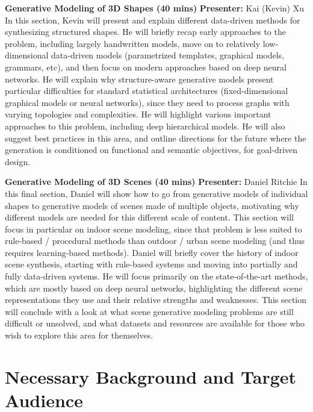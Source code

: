 \documentclass{egpubl}
\begin{document}
\noindent
\textbf{Generative Modeling of 3D Shapes (40 mins)}
\newline
\textbf{Presenter:} Kai (Kevin) Xu
\newline
In this section, Kevin will present and explain different data-driven methods for synthesizing structured shapes. He will briefly recap early approaches to the problem, including largely handwritten models, move on to relatively low-dimensional data-driven models (parametrized templates, graphical models, grammars, etc), and then focus on modern approaches based on deep neural networks. He will explain why structure-aware generative models present particular difficulties for standard statistical architectures (fixed-dimensional graphical models or neural networks), since they need to process graphs with varying topologies and complexities. He will highlight various important approaches to this problem, including deep hierarchical models. He will also suggest best practices in this area, and outline directions for the future where the generation is conditioned on functional and semantic objectives, for goal-driven design.

\noindent
\textbf{Generative Modeling of 3D Scenes (40 mins)}
\newline
\textbf{Presenter:} Daniel Ritchie
\newline
In this final section, Daniel will show how to go from generative models of individual shapes to generative models of scenes made of multiple objects, motivating why different models are needed for this different scale of content.
This section will focus in particular on indoor scene modeling, since that problem is less suited to rule-based / procedural methods than outdoor / urban scene modeling (and thus requires learning-based methods).
Daniel will briefly cover the history of indoor scene synthesis, starting with rule-based systems and moving into partially and fully data-driven systems.
He will focus primarily on the state-of-the-art methods, which are mostly based on deep neural networks, highlighting the different scene representations they use and their relative strengths and weaknesses.
This section will conclude with a look at what scene generative modeling problems are still difficult or unsolved, and what datasets and resources are available for those who wish to explore this area for themselves.

\section{Necessary Background and Target Audience}
\end{document}
